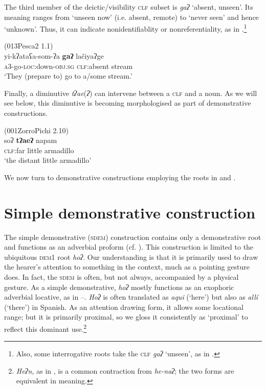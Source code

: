 \documentclass[output=paper,colorlinks,citecolor=brown]{langscibook}
\begin{document}
The third member of the deictic/visibility \textsc{clf} subset is \textit{gaʔ} ‘absent, unseen’. Its meaning ranges from ‘unseen now’ (i.e. absent, remote) to ‘never seen’ and hence ‘unknown’. Thus, it can indicate nonidentifiablity or nonreferentiality, as in .\footnote{Also, some interrogative roots take the \textsc{clf} \textit{gaʔ} ‘unseen’, as in .}

\ea\label{ex:payne:17} (013Pesca2 1.1)\\
\gll  yi-kʔataʕa-som-ʔa  \textbf{gaʔ}  lačiyaʔge\\
\textsc{a3}-go-\textsc{loc}:down-\textsc{obj.sg}  \textsc{clf}:absent stream\\
\glt ‘They (prepare to) go to a/some stream.’ 
\z

Finally, a diminutive \textit{tʔae}(\textit{ʔ}) can intervene between a \textsc{clf} and a noun. As we will see below, this diminutive is becoming morphologised as part of demonstrative constructions.

\ea\label{ex:payne:18} (001ZorroPichi 2.10)\\
\gll  soʔ  \textbf{tʔaeʔ}  napam\\
 \textsc{clf}:far  little  armadillo\\
\glt ‘the distant little armadillo’ 
\z

We now turn to demonstrative constructions employing the roots in  and .

\section{Simple demonstrative construction}\label{sec:payne:4}

The simple demonstrative (\textsc{sdem}) construction contains only a demonstrative root and functions as an adverbial proform (cf. ). This construction is limited to the ubiquitous \textsc{dem1} root \textit{hoʔ}. Our understanding is that it is primarily used to draw the hearer’s attention to something in the context, much as a pointing gesture does. In fact, the \textsc{sdem} is often, but not always, accompanied by a physical gesture. As a simple demonstrative, \textit{hoʔ} mostly functions as an exophoric adverbial locative, as in –. \textit{Hoʔ} is often translated as \textit{aqui} (‘here’) but also as \textit{allí} (‘there’) in Spanish. As an attention drawing form, it allows some locational range; but it is primarily proximal, so we gloss it consistently as ‘proximal’ to reflect this dominant use.\footnote{\textit{Heʔn,} as in , is a common contraction from \textit{he-naʔ}; the two forms are equivalent in meaning.}
\end{document}
